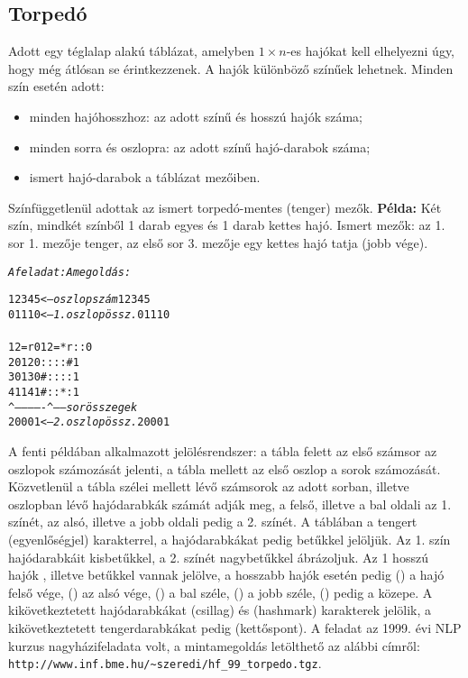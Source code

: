 \subsection{Torpedó}

Adott egy téglalap alakú táblázat, amelyben $1 \times n$-es hajókat kell elhelyezni
úgy, hogy még átlósan se érintkezzenek. A hajók különböző színűek lehetnek. Minden
szín esetén adott:
\begin{itemize}
\item minden hajóhosszhoz: az adott színű és hosszú hajók száma;
\item minden sorra és oszlopra: az adott színű hajó-darabok száma;
\item ismert hajó-darabok a táblázat mezőiben.
\end{itemize}
Színfüggetlenül adottak az ismert torpedó-mentes (tenger) mezők.
\br
{\bf Példa:} Két szín, mindkét színből 1 darab egyes és 1 darab kettes hajó.
Ismert mezők: az 1. sor 1. mezője tenger, az első sor 3. mezője egy kettes
hajó tatja (jobb vége).

\begin{alltt}
     {\rm \em A feladat:}                                     {\rm \em A megoldás:}
\end{alltt}
\begin{alltt}
      1 2 3 4 5     <-- {\em oszlopszám     }              1 2 3 4 5     
      0 1 1 1 0     <-- {\em 1. oszlopössz. }              0 1 1 1 0     
                        {\em                }                            
1  2  =   r      0      {\em                }        1  2  = * r : :  0
2  0             1      {\em                }        2  0  : : : : #  1  
3  0             1      {\em                }        3  0  # : : : :  1  
4  1             1      {\em                }        4  1  # : : * :  1  
   ^-------------^------{\em sorösszegek    }          
      2 0 0 0 1     <-- {\em 2. oszlopössz. }              2 0 0 0 1     
\end{alltt}

A fenti példában alkalmazott jelölésrendszer: a tábla felett az első számsor az
oszlopok számozását jelenti, a tábla mellett az első oszlop a sorok számozását.
Közvetlenül a tábla szélei mellett lévő számsorok az adott sorban, illetve oszlopban
lévő hajódarabkák számát adják meg, a felső, illetve a bal oldali az 1. színét,
az alsó, illetve a jobb oldali pedig a 2. színét. A táblában a tengert \cd{=}
(egyenlőségjel) karakterrel, a hajódarabkákat pedig betűkkel jelöljük. Az 1. szín
hajódarabkáit kisbetűkkel, a 2. színét nagybetűkkel ábrázoljuk. Az 1 hosszú hajók
, illetve  betűkkel vannak jelölve, a hosszabb hajók esetén pedig 
() a hajó felső vége,  () az alsó vége,  () a bal széle,
 () a jobb széle,  () pedig a közepe. A kikövetkeztetett
hajódarabkákat \cd{*} (csillag) és \cd{\#} (hashmark) karakterek jelölik, a
kikövetkeztetett tengerdarabkákat pedig \cd{:} (kettőspont).
\br
A feladat az 1999. évi NLP kurzus nagyházifeladata volt, a mintamegoldás letölthető
az alábbi címről: \verb'http://www.inf.bme.hu/~szeredi/hf_99_torpedo.tgz'.

